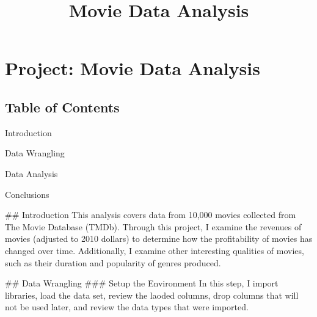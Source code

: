 \documentclass[11pt]{article}
\title{Movie Data Analysis}
\begin{document}
    
    
    \maketitle
    
    

    
    \section{Project: Movie Data
Analysis}\label{project-movie-data-analysis}

\subsection{Table of Contents}\label{table-of-contents}

Introduction

Data Wrangling

Data Analysis

Conclusions

 \#\# Introduction This analysis covers data from 10,000 movies
collected from The Movie Database (TMDb). Through this project, I
examine the revenues of movies (adjusted to 2010 dollars) to determine
how the profitability of movies has changed over time. Additionally, I
examine other interesting qualities of movies, such as their duration
and popularity of genres produced.

     \#\# Data Wrangling \#\#\# Setup the Environment In this step, I import
libraries, load the data set, review the laoded columns, drop columns
that will not be used later, and review the data types that were
imported.
\end{document}
